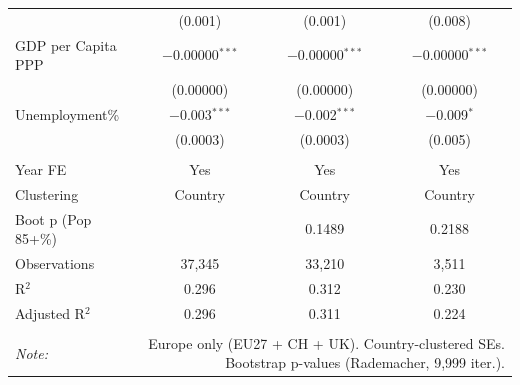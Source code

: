 \begin{table}[!htbp]
\begin{tabular}{@{\extracolsep{5pt}}lccc}
  & (0.001) & (0.001) & (0.008) \\ 
  GDP per Capita PPP & $-$0.00000$^{***}$ & $-$0.00000$^{***}$ & $-$0.00000$^{***}$ \\ 
  & (0.00000) & (0.00000) & (0.00000) \\ 
  Unemployment\% & $-$0.003$^{***}$ & $-$0.002$^{***}$ & $-$0.009$^{*}$ \\ 
  & (0.0003) & (0.0003) & (0.005) \\ 
 \hline \\[-1.8ex] 
Year FE & Yes & Yes & Yes \\ 
Clustering & Country & Country & Country \\ 
Boot p (Pop 85+\%) &  & 0.1489 & 0.2188 \\ 
Observations & 37,345 & 33,210 & 3,511 \\ 
R$^{2}$ & 0.296 & 0.312 & 0.230 \\ 
Adjusted R$^{2}$ & 0.296 & 0.311 & 0.224 \\ 
\hline 
\hline \\[-1.8ex] 
\textit{Note:}  & \multicolumn{3}{r}{Europe only (EU27 + CH + UK). Country-clustered SEs. Bootstrap p-values (Rademacher, 9,999 iter.).} \\ 
\end{tabular} 
\end{table} 
